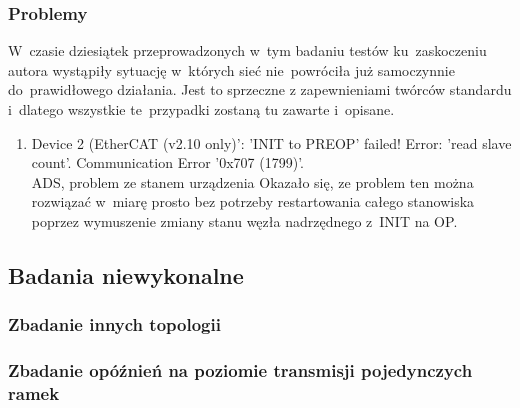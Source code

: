\subsubsection{Problemy}
W~czasie dziesiątek przeprowadzonych w~tym badaniu testów ku~zaskoczeniu autora wystąpiły sytuację w~których sieć nie~powróciła już samoczynnie do~prawidłowego działania. Jest to sprzeczne z zapewnieniami twórców standardu i~dlatego wszystkie te~przypadki zostaną tu zawarte i~opisane.

\begin{enumerate}
\item Device 2 (EtherCAT (v2.10 only)': 'INIT to PREOP' failed! Error: 'read slave count'. Communication Error '0x707 (1799)'. \\[1mm]
ADS, problem ze stanem urządzenia
Okazało się, ze problem ten można rozwiązać w~miarę prosto bez potrzeby restartowania całego stanowiska poprzez wymuszenie zmiany stanu węzła nadrzędnego z~INIT na OP.
\end{enumerate}

\subsection{Badania niewykonalne}

\subsubsection{Zbadanie innych topologii}

\subsubsection{Zbadanie opóźnień na poziomie transmisji pojedynczych ramek}
%
%
%
%
